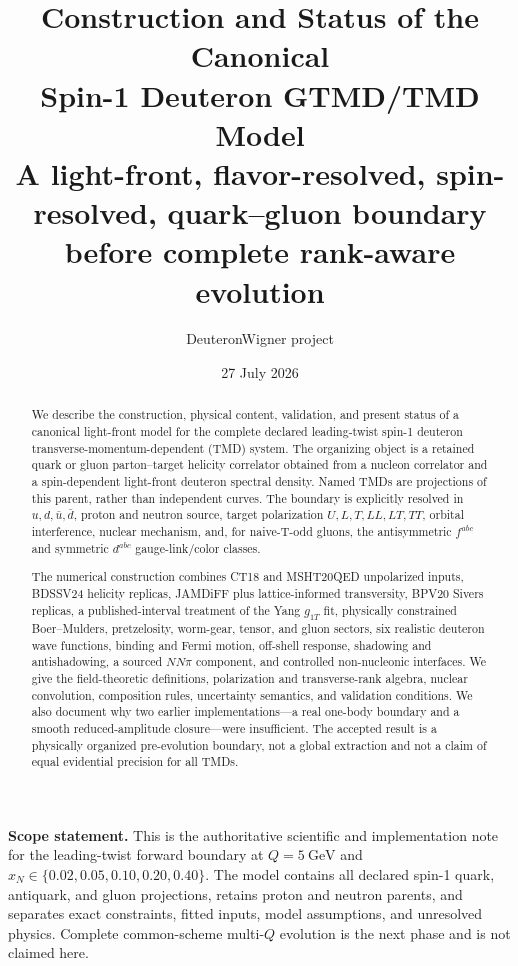 \documentclass[11pt]{article}
\title{\vspace{-1.0cm}
  {\color{navy}\bfseries Construction and Status of the Canonical\\[2mm]
  Spin-1 Deuteron GTMD/TMD Model}\\[4mm]
  \large A light-front, flavor-resolved, spin-resolved, quark--gluon boundary
  before complete rank-aware evolution}
\author{DeuteronWigner project}
\date{27 July 2026}
\begin{document}
\maketitle

\begin{center}
\begin{minipage}{0.93\textwidth}
\colorbox{softblue}{\parbox{0.96\textwidth}{
\textbf{Scope statement.}
This is the authoritative scientific and implementation note for the
leading-twist forward boundary at
\(Q=5~\mathrm{GeV}\) and
\(x_N\in\{0.02,0.05,0.10,0.20,0.40\}\).
The model contains all declared spin-1 quark, antiquark, and gluon
projections, retains proton and neutron parents, and separates exact
constraints, fitted inputs, model assumptions, and unresolved physics.
Complete common-scheme multi-\(Q\) evolution is the next phase and is not
claimed here.
}}
\end{minipage}
\end{center}

\begin{abstract}
We describe the construction, physical content, validation, and present
status of a canonical light-front model for the complete declared
leading-twist spin-1 deuteron transverse-momentum-dependent (TMD) system.
The organizing object is a retained quark or gluon parton--target helicity
correlator obtained from a nucleon correlator and a spin-dependent
light-front deuteron spectral density.  Named TMDs are projections of this
parent, rather than independent curves.  The boundary is explicitly
resolved in \(u,d,\bar u,\bar d\), proton and neutron source, target
polarization \(U,L,T,LL,LT,TT\), orbital interference, nuclear mechanism,
and, for naive-T-odd gluons, the antisymmetric \(f^{abc}\) and symmetric
\(d^{abc}\) gauge-link/color classes.

The numerical construction combines CT18 and MSHT20QED unpolarized inputs,
BDSSV24 helicity replicas, JAMDiFF plus lattice-informed transversity,
BPV20 Sivers replicas, a published-interval treatment of the Yang
\(g_{1T}\) fit, physically constrained Boer--Mulders, pretzelosity,
worm-gear, tensor, and gluon sectors, six realistic deuteron wave
functions, binding and Fermi motion, off-shell response, shadowing and
antishadowing, a sourced \(NN\pi\) component, and controlled non-nucleonic
interfaces.  We give the field-theoretic definitions, polarization and
transverse-rank algebra, nuclear convolution, composition rules,
uncertainty semantics, and validation conditions.  We also document why
two earlier implementations---a real one-body boundary and a smooth
reduced-amplitude closure---were insufficient.  The accepted result is a
physically organized pre-evolution boundary, not a global extraction and
not a claim of equal evidential precision for all TMDs.
\end{abstract}
\end{document}
